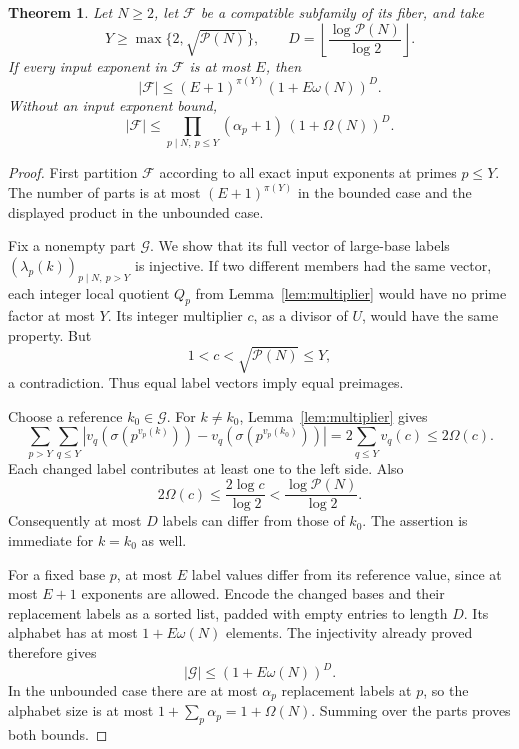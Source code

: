 \documentclass[11pt]{article}
\newtheorem{theorem}{Theorem}[section]
\newcommand{\PP}{\mathcal P}
\newcommand{\FF}{\mathcal F}
\begin{document}
\begin{theorem}\label{thm:finite}
Let $N\ge2$, let $\FF$ be a compatible subfamily of its fiber, and take
\[
 Y\ge\max\{2,\sqrt{\PP(N)}\},\qquad
 D=\left\lfloor\frac{\log\PP(N)}{\log2}\right\rfloor.
\]
If every input exponent in $\FF$ is at most $E$, then
\begin{equation}\label{eq:finiteE}
 \boxed{|\FF|\le (E+1)^{\pi(Y)}(1+E\omega(N))^D.}
\end{equation}
Without an input exponent bound,
\begin{equation}\label{eq:finiteunbounded}
 \boxed{|\FF|\le
 \prod_{p\mid N,\ p\le Y}(\alpha_p+1)\,
 (1+\Omega(N))^D.}
\end{equation}
\end{theorem}
\begin{proof}
First partition $\FF$ according to all exact input exponents at primes $p\le Y$. The number of parts is at most $(E+1)^{\pi(Y)}$ in the bounded case and the displayed product in the unbounded case.

Fix a nonempty part $\mathcal G$. We show that its full vector of large-base labels $(\lambda_p(k))_{p\mid N,\ p>Y}$ is injective. If two different members had the same vector, each integer local quotient $Q_p$ from Lemma~\ref{lem:multiplier} would have no prime factor at most $Y$. Its integer multiplier $c$, as a divisor of $U$, would have the same property. But
\[
 1<c<\sqrt{\PP(N)}\le Y,
\]
a contradiction. Thus equal label vectors imply equal preimages.

Choose a reference $k_0\in\mathcal G$. For $k\ne k_0$, Lemma~\ref{lem:multiplier} gives
\[
 \sum_{p>Y}\sum_{q\le Y}
 \left|v_q(\sigma(p^{v_p(k)}))-v_q(\sigma(p^{v_p(k_0)}))\right|
 =2\sum_{q\le Y}v_q(c)\le2\Omega(c).
\]
Each changed label contributes at least one to the left side. Also
\[
 2\Omega(c)\le\frac{2\log c}{\log2}
 <\frac{\log\PP(N)}{\log2}.
\]
Consequently at most $D$ labels can differ from those of $k_0$. The assertion is immediate for $k=k_0$ as well.

For a fixed base $p$, at most $E$ label values differ from its reference value, since at most $E+1$ exponents are allowed. Encode the changed bases and their replacement labels as a sorted list, padded with empty entries to length $D$. Its alphabet has at most $1+E\omega(N)$ elements. The injectivity already proved therefore gives
\[
 |\mathcal G|\le(1+E\omega(N))^D.
\]
In the unbounded case there are at most $\alpha_p$ replacement labels at $p$, so the alphabet size is at most $1+\sum_p\alpha_p=1+\Omega(N)$. Summing over the parts proves both bounds.
\end{proof}
\end{document}
